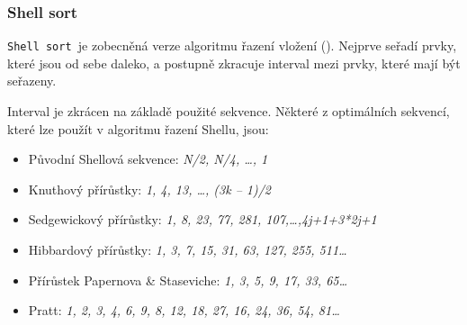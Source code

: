 \documentclass[12pt]{beamer}
\begin{document}
\begin{frame}
\begin{columns}[T]
\begin{column}{.48\textwidth}
\begin{figure}[htb]
        \end{figure}
    \end{column}%
    
    \end{columns}
    
    
\end{frame}

\begin{frame}
    \frametitle{Shell sort}
    \fontsize{10pt}{12pt}\selectfont
    
    \hspace*{20pt}\texttt{Shell sort }je zobecněná verze algoritmu řazení vložení ().
    Nejprve seřadí prvky, které jsou od sebe daleko, a postupně zkracuje interval mezi prvky, které mají být seřazeny.
    
    \vspace{\baselineskip}
    \hspace*{20pt}Interval je zkrácen na základě použité sekvence. Některé z optimálních sekvencí, které lze použít v algoritmu řazení Shellu, jsou:
    \vspace{\baselineskip}
    
    \begin{itemize}
    \setlength{\itemindent}{3em}
        \item Původní Shellová sekvence: \emph{N/2, N/4, \dots, 1}
        \item Knuthový přírůstky: \emph{1, 4, 13, \dots, (3k – 1)/2}
        \item Sedgewickový přírůstky: \emph{1, 8, 23, 77, 281, 107,\dots,4j+1+3*2j+1}
        \item Hibbardový přírůstky: \emph{1, 3, 7, 15, 31, 63, 127, 255, 511\dots}
        \item Přírůstek Papernova \& Staseviche: \emph{1, 3, 5, 9, 17, 33, 65\dots}
        \item Pratt: \emph{1, 2, 3, 4, 6, 9, 8, 12, 18, 27, 16, 24, 36, 54, 81\dots}
    \end{itemize}   
\end{frame}
\end{document}

